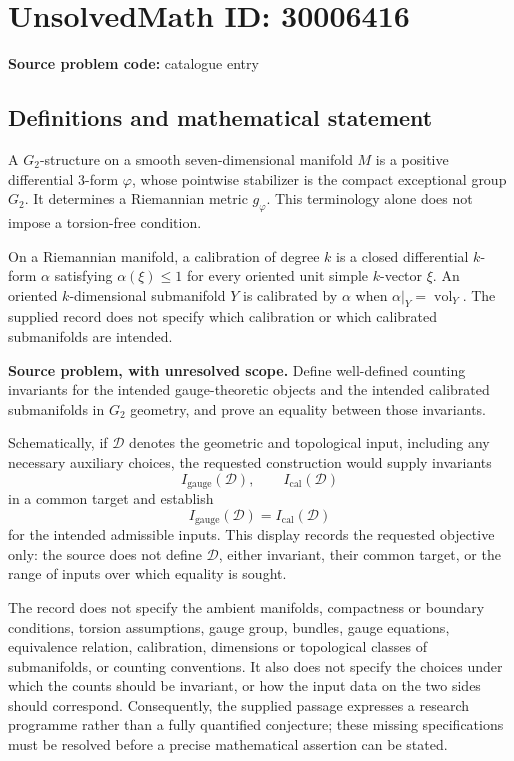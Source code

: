 \documentclass[11pt]{article}
\begin{document}
\section*{UnsolvedMath ID: 30006416}
\textbf{Source problem code:} catalogue entry
\subsection{Definitions and mathematical statement}
A \(G_2\)-structure on a smooth seven-dimensional manifold \(M\) is a positive differential \(3\)-form \(\varphi\), whose pointwise stabilizer is the compact exceptional group \(G_2\). It determines a Riemannian metric \(g_\varphi\). This terminology alone does not impose a torsion-free condition.

On a Riemannian manifold, a calibration of degree \(k\) is a closed differential \(k\)-form \(\alpha\) satisfying \(\alpha(\xi)\leq 1\) for every oriented unit simple \(k\)-vector \(\xi\). An oriented \(k\)-dimensional submanifold \(Y\) is calibrated by \(\alpha\) when \(\alpha|_Y=\operatorname{vol}_Y\). The supplied record does not specify which calibration or which calibrated submanifolds are intended.

\textbf{Source problem, with unresolved scope.} Define well-defined counting invariants for the intended gauge-theoretic objects and the intended calibrated submanifolds in \(G_2\) geometry, and prove an equality between those invariants.

Schematically, if \(\mathcal D\) denotes the geometric and topological input, including any necessary auxiliary choices, the requested construction would supply invariants
\[
I_{\mathrm{gauge}}(\mathcal D),\qquad I_{\mathrm{cal}}(\mathcal D)
\]
in a common target and establish
\[
I_{\mathrm{gauge}}(\mathcal D)=I_{\mathrm{cal}}(\mathcal D)
\]
for the intended admissible inputs. This display records the requested objective only: the source does not define \(\mathcal D\), either invariant, their common target, or the range of inputs over which equality is sought.

The record does not specify the ambient manifolds, compactness or boundary conditions, torsion assumptions, gauge group, bundles, gauge equations, equivalence relation, calibration, dimensions or topological classes of submanifolds, or counting conventions. It also does not specify the choices under which the counts should be invariant, or how the input data on the two sides should correspond. Consequently, the supplied passage expresses a research programme rather than a fully quantified conjecture; these missing specifications must be resolved before a precise mathematical assertion can be stated.
\end{document}
